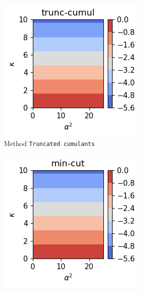 \begin{figure}[h!]
    \centering
    \begin{subfigure}{0.32\linewidth}
        \centering
        \includegraphics[width=\linewidth]{Pics/H_0_and_losses_1_p_1_rule_trunc-cumul.pdf}
        \caption{Method \texttt{Truncated cumulants}}
        \label{fig:H_0_and_losses_1_p_1_rule_trunc-cumul}
    \end{subfigure}
    \hfill
    \begin{subfigure}{0.32\linewidth}
        \centering
        \includegraphics[width=\linewidth]{Pics/H_0_and_losses_1_p_1_rule_min-cut.pdf}

\end{subfigure}
\end{figure}
